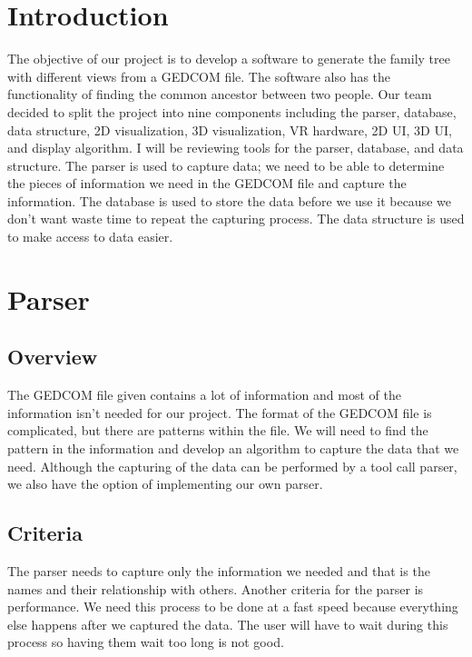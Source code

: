 \documentclass[onecolumn, draftclsnofoot,10pt, compsoc]{IEEEtran}
\begin{document}
\section{Introduction}
The objective of our project is to develop a software to generate the family tree with different views from a GEDCOM file. The software also has the functionality of finding the common ancestor between two people. Our team decided to split the project into nine components including the parser, database, data structure, 2D visualization, 3D visualization, VR hardware, 2D UI, 3D UI, and display algorithm. I will be reviewing tools for the parser, database, and data structure. The parser is used to capture data; we need to be able to determine the pieces of information we need in the GEDCOM file and capture the information. The database is used to store the data before we use it because we don't want waste time to repeat the capturing process. The data structure is used to make access to data easier.

\section{Parser}
\subsection{Overview}
\begin{singlespace}
The GEDCOM file given contains a lot of information and most of the information isn't needed for our project. The format of the GEDCOM file is complicated, but there are patterns within the file. We will need to find the pattern in the information and develop an algorithm to capture the data that we need. Although the capturing of the data can be performed by a tool call parser, we also have the option of implementing our own parser.
\end{singlespace}

\subsection{Criteria}
\begin{singlespace}
The parser needs to capture only the information we needed and that is the names and their relationship with others. Another criteria for the parser is performance. We need this process to be done at a fast speed because everything else happens after we captured the data. The user will have to wait during this process so having them wait too long is not good.
\end{singlespace}
\end{document}
